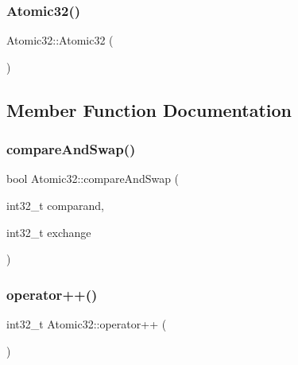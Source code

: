 \mbox{\label{class_atomic32_a34f5641dfe5bfd1eb7dedf3c81e21798}} 
\subsubsection{\texorpdfstring{Atomic32()}{Atomic32()}\hspace{0.1cm}{\footnotesize\ttfamily [2/2]}}
{\footnotesize\ttfamily Atomic32\+::\+Atomic32 (\begin{DoxyParamCaption}{ }\end{DoxyParamCaption})\hspace{0.3cm}{\ttfamily [inline]}}



\subsection{Member Function Documentation}
\mbox{\label{class_atomic32_a00fe115c7138497ce5d7de9001b3166f}} 
\subsubsection{\texorpdfstring{compare\+And\+Swap()}{compareAndSwap()}}
{\footnotesize\ttfamily bool Atomic32\+::compare\+And\+Swap (\begin{DoxyParamCaption}\item[{int32\+\_\+t}]{comparand,  }\item[{int32\+\_\+t}]{exchange }\end{DoxyParamCaption})\hspace{0.3cm}{\ttfamily [inline]}}

\mbox{\label{class_atomic32_a65db178dc93ef4f57535a9eecbab0046}} 
\subsubsection{\texorpdfstring{operator++()}{operator++()}\hspace{0.1cm}{\footnotesize\ttfamily [1/2]}}
{\footnotesize\ttfamily int32\+\_\+t Atomic32\+::operator++ (\begin{DoxyParamCaption}{ }\end{DoxyParamCaption})\hspace{0.3cm}{\ttfamily [inline]}}

